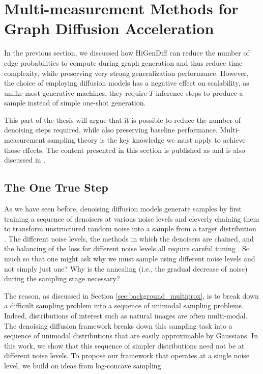 \section{Multi-measurement Methods for Graph Diffusion Acceleration}
\label{sec: multiprox}

In the previous section, we discussed how HiGenDiff can reduce the number of edge probabilities to compute during graph generation and thus reduce time complexity, while preserving very strong generalization performance. However, the choice of employing diffusion models has a negative effect on scalability, as unlike most generative machines, they require $T$ inference steps to produce a sample instead of simple one-shot generation.

This part of the thesis will argue that it is possible to reduce the number of denoising steps required, while also preserving baseline performance. Multi-measurement sampling theory is the key knowledge we must apply to achieve those effects. The content presented in this section is published as \cite{dadi_improving_2025} and is also discussed in \cite{dadi_noisy_2025}.

\subsection{The One True Step}

As we have seen before, denoising diffusion models generate samples by first training a sequence of denoisers at various noise levels and cleverly chaining them to transform unstructured random noise into a sample from a target distribution \cite{ho_denoising_2020, dhariwal_diffusion_2021}. The different noise levels, the methods in which the denoisers are chained, and the balancing of the loss for different noise levels all require careful tuning \cite{karras_elucidating_2022}. So much so that one might ask why we must sample using different noise levels and not simply just one? Why is the annealing (i.e., the gradual decrease of noise) during the sampling stage necessary? 

The reason, as discussed in Section \ref{sec:background_multiprox}, is to break down a difficult sampling problem into a sequence of unimodal sampling problems. Indeed, distributions of interest such as natural images are often multi-modal. The denoising diffusion framework breaks down this sampling task into a sequence of unimodal distributions that are easily approximable by Gaussians. In this work, we show that this sequence of simpler distributions need not be at different noise levels. To propose our framework that operates at a single noise level, we build on ideas from log-concave sampling.

